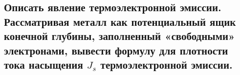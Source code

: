 \subsection{Описать явление термоэлектронной эмиссии. Рассматривая металл как потенциальный
ящик конечной глубины, заполненный «свободными» электронами, вывести формулу для плотности
тока насыщения $J_s$ термоэлектронной эмиссии.}


